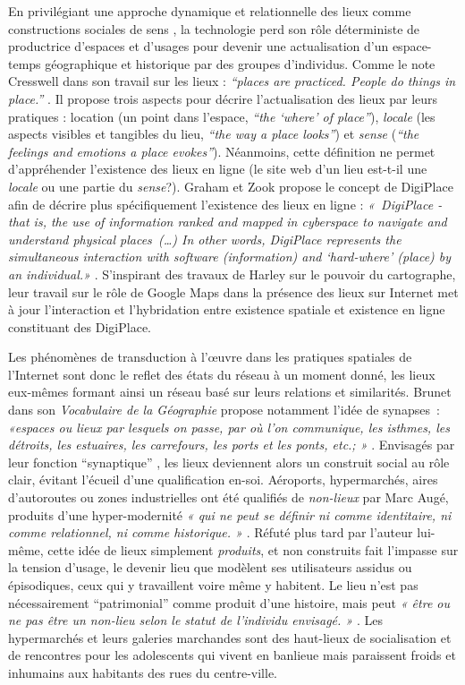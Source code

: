 En privilégiant une approche dynamique et relationnelle des lieux comme constructions sociales de sens \citep{Kyle2007}, la technologie perd son rôle déterministe de productrice d’espaces et d’usages pour devenir une actualisation d’un espace-temps géographique et historique par des groupes d’individus. Comme le note Cresswell dans son travail sur les lieux : \textit{“places are practiced. People do things in place.”} \citep{Cresswell2004}. Il propose trois aspects pour décrire l’actualisation des lieux par leurs pratiques : location (un point dans l’espace, \textit{“the ‘where’ of place”}), \textit{locale} (les aspects visibles et tangibles du lieu, \textit{“the way a place looks”}) et \textit{sense} (\textit{“the feelings and emotions a place evokes”}). Néanmoins, cette définition ne permet d’appréhender l’existence des lieux en ligne (le site web d’un lieu est-t-il une \textit{locale} ou une partie du \textit{sense}?). Graham et Zook propose le concept de DigiPlace afin de décrire plus spécifiquement l’existence des lieux en ligne : \textit{« DigiPlace - that is, the use of information ranked and mapped in cyberspace to navigate and understand physical places (…) In other words, DigiPlace represents the simultaneous interaction with software (information) and `hard-where' (place) by an individual.»} \citep{Zook2007}. S’inspirant des travaux de Harley sur le pouvoir du cartographe, leur travail sur le rôle de Google Maps dans la présence des lieux sur Internet met à jour l’interaction et l’hybridation entre existence spatiale et existence en ligne constituant des DigiPlace. 

Les phénomènes de transduction à l’œuvre dans les pratiques spatiales de l’Internet sont donc le reflet des états du réseau à un moment donné, les lieux eux-mêmes formant ainsi un réseau basé sur leurs relations et similarités. Brunet dans son \textit{Vocabulaire de la Géographie} propose notamment l’idée de synapses : \textit{«espaces ou lieux par lesquels on passe, par où l'on communique, les isthmes, les détroits, les estuaires, les carrefours, les ports et les ponts, etc.; »} \citep{Brunet1972}. Envisagés par leur fonction “synaptique” , les lieux deviennent alors un construit social au rôle clair, évitant l’écueil d’une qualification en-soi. Aéroports, hypermarchés, aires d’autoroutes ou zones industrielles ont été qualifiés de \textit{non-lieux} par Marc Augé, produits d’une  hyper-modernité \textit{« qui ne peut se définir ni comme identitaire, ni comme relationnel, ni comme historique. »} \citep{Auge1995}. Réfuté plus tard par l’auteur lui-même, cette idée de lieux simplement \textit{produits}, et non construits fait l’impasse sur la tension d’usage, le devenir lieu que modèlent ses utilisateurs assidus ou épisodiques, ceux qui y travaillent voire même y habitent. Le lieu n’est pas nécessairement “patrimonial” comme produit d’une histoire, mais peut \textit{« être ou ne pas être un non-lieu selon le statut de l'individu envisagé. »} \citep{Debarbieux1993}. Les hypermarchés et leurs galeries marchandes sont des haut-lieux de socialisation et de rencontres pour les adolescents qui vivent en banlieue \citep{Matthews2000} mais paraissent froids et inhumains aux habitants des rues du centre-ville.

